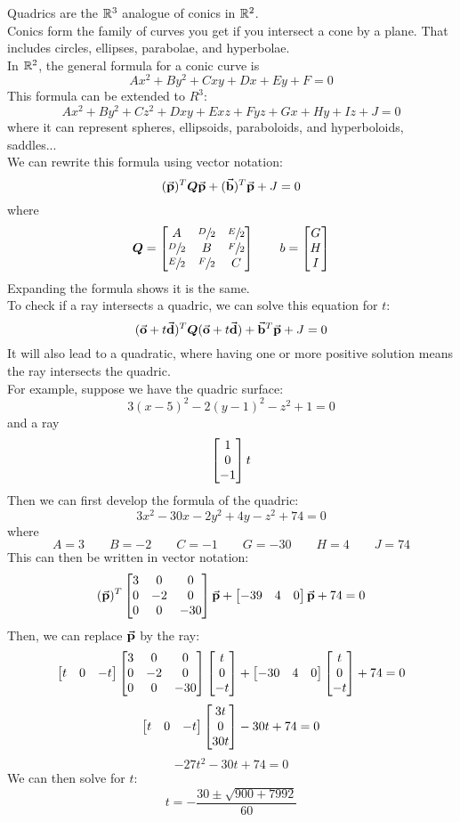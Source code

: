 \documentclass[12pt]{article}
\begin{document}
Quadrics are the $\mathbb{R}^3$ analogue of conics in $\mathbb{R}^2$. \\
Conics form the family of curves you get if you intersect
a cone by a plane.
That includes circles, ellipses, parabolae,
and hyperbolae. \\
In $\mathbb{R}^2$, the general formula for a conic curve is
\[ Ax^2 + By^2 + Cxy + Dx + Ey + F = 0 \]
This formula can be extended to $R^3$:
\[ Ax^2 + By^2 + Cz^2 + Dxy + Exz + Fyz +
Gx + Hy + Iz + J = 0 \]
where it can represent spheres, ellipsoids,
paraboloids, and hyperboloids, saddles... \\

We can rewrite this formula using vector notation:
\[ (\vec{\mathbf{p}})^T \boldsymbol{Q}\vec{\mathbf{p}} 
+ (\vec{\mathbf{b}})^T\vec{\mathbf{p}} + J = 0 \]
where
\[ 
    \boldsymbol{Q} = 
    \begin{bmatrix} {A} & {\sfrac{D}{2}} & {\sfrac{E}{2}} \\
    {\sfrac{D}{2}} & {B} & {\sfrac{F} {2}} \\ 
    {\sfrac{E}{2}} & {\sfrac{F}{2}} & {C} \end{bmatrix}
    \qquad b = \begin{bmatrix} {G} \\ {H} \\{I} \end{bmatrix}
\]
Expanding the formula shows it is the same. \\

To check if a ray intersects a quadric,
we can solve this equation for $t$:
\[ (\vec{\mathbf{o}} + t\vec{\mathbf{d}})^T \boldsymbol{Q} (\vec{\mathbf{o}} + t\vec{\mathbf{d}})
    + \vec{\mathbf{b}}^T\vec{\mathbf{p}} + J = 0 \]
It will also lead to a quadratic, 
where having one or more positive solution
means the ray intersects the quadric. \\

For example,
suppose we have the quadric surface:
\[ 3(x-5)^2 - 2(y-1)^2 -z^2 + 1 = 0 \]
and a ray
\[ \begin{bmatrix} {1} \\{0} \\{-1} \end{bmatrix}t \]
Then we can first develop the formula of the quadric:
\[ 3x^2 - 30x - 2y^2 +4y -z^2 + 74 = 0 \]
where
\[ 
    A = 3 \qquad B = -2 \qquad C = -1 \qquad G = -30
    \qquad H = 4  \qquad J = 74
\]
This can then be written in vector notation:
\[
    (\vec{\mathbf{p}})^T
    \begin{bmatrix} {3}&{0}&{0} \\ {0}&{-2}&{0} \\ {0}&{0}&{-30} \end{bmatrix}
    \vec{\mathbf{p}}
    + \begin{bmatrix} {-39}&{4}&{0} \end{bmatrix}
    \vec{\mathbf{p}}
    + 74 = 0
\]
Then, we can replace $\vec{\mathbf{p}}$ by the ray:
\[
    \begin{bmatrix} {t}&{0}&{-t} \end{bmatrix}
    \begin{bmatrix} {3}&{0}&{0}\\{0}&{-2}&{0}\\{0}&{0}&{-30} \end{bmatrix}
    \begin{bmatrix} {t}\\{0}\\{-t} \end{bmatrix}
    + \begin{bmatrix} {-30}&{4}&{0} \end{bmatrix}
    \begin{bmatrix} {t}\\{0}\\{-t} \end{bmatrix}
    + 74 = 0
\]
\[
    \begin{bmatrix} {t}&{0}&{-t} \end{bmatrix}
    \begin{bmatrix} {3t}\\{0}\\{30t} \end{bmatrix}
    - 30t + 74 = 0
\]
\[
    -27t^2 - 30t + 74 = 0                                                                                                                                                                                                                                               
\]
We can then solve for $t$:
\[ t = -\dfrac{30 \pm \sqrt{900 + 7992}}{60} \]


 
\end{document}
